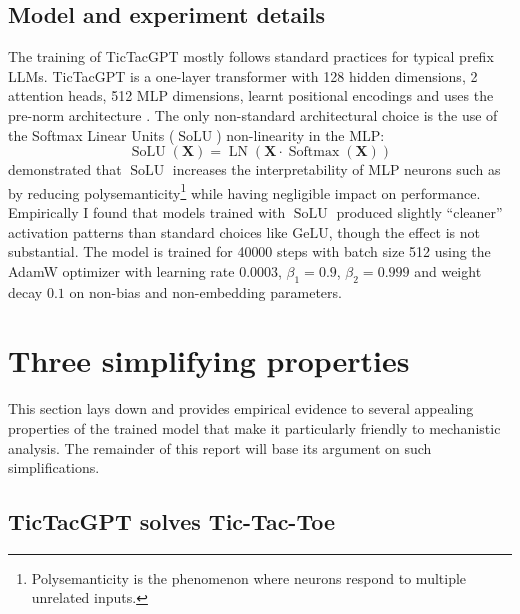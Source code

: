 \documentclass{article}
\newcommand{\ttgpt}{TicTacGPT\xspace}
\newcommand{\ttt}{Tic-Tac-Toe\xspace}
\newcommand{\m}[1]{\mathbf{\bm{#1}}}
\DeclareMathOperator{\softmax}{Softmax}
\DeclareMathOperator{\solu}{SoLU}
\DeclareMathOperator{\layernorm}{LN}
\begin{document}
\subsection{Model and experiment details}

The training of \ttgpt mostly follows standard practices \citep{radford2019language} for typical prefix \ac{LLMs}. \ttgpt is a one-layer transformer with 128 hidden dimensions, 2 attention heads, 512 MLP dimensions, learnt positional encodings and uses the pre-norm architecture \citep{xiong2020layer}. The only non-standard architectural choice is the use of the Softmax Linear Units ($\solu$) \citep{elhage2022solu} non-linearity in the MLP:
\begin{equation*}
    \solu(\m{X}) = \layernorm(\m{X} \cdot \softmax(\m{X}))
\end{equation*}
\citet{elhage2022solu} demonstrated that $\solu$ increases the interpretability of MLP neurons such as by reducing polysemanticity\footnote{Polysemanticity is the phenomenon where neurons respond to multiple unrelated inputs.}\citep{olah2020zoom} while having negligible impact on performance. Empirically I found that models trained with $\solu$ produced slightly ``cleaner'' activation patterns than standard choices like $\text{GeLU}$, though the effect is not substantial. The model is trained for 40000 steps with batch size 512 using the AdamW optimizer \citep{loshchilov2017decoupled} with learning rate $0.0003$, $\beta_1 = 0.9$, $\beta_2 = 0.999$ and weight decay $0.1$ on non-bias and non-embedding parameters.

\section{Three simplifying properties} \label{sec:simplify}

This section lays down and provides empirical evidence to several appealing properties of the trained model that make it particularly friendly to mechanistic analysis. The remainder of this report will base its argument on such simplifications.

\subsection{\ttgpt solves \ttt}


\end{document}
